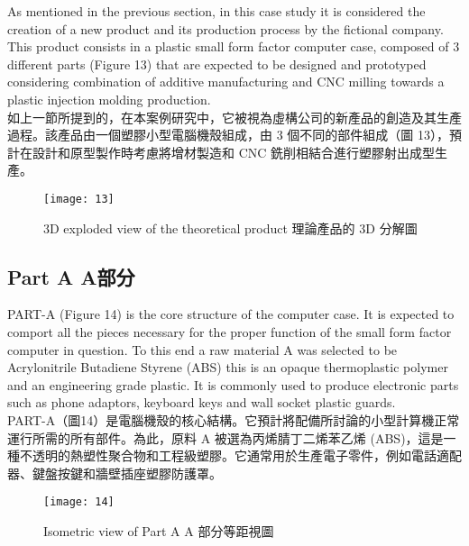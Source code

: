 \fontsize{14pt}{2.5pt}\sectionef 
{As mentioned in the previous section, in this case study it is considered the creation of a new product and its production process by the fictional company. This product consists in a plastic small form factor computer case, composed of 3 different parts (Figure 13) that are expected to be designed and prototyped considering combination of additive manufacturing and CNC milling towards a plastic injection molding production.}\\[10pt]

\fontsize{14pt}{5pt}\sectionef
 {如上一節所提到的，在本案例研究中，它被視為虛構公司的新產品的創造及其生產過程。該產品由一個塑膠小型電腦機殼組成，由 3 個不同的部件組成（圖 13），預計在設計和原型製作時考慮將增材製造和 CNC 銑削相結合進行塑膠射出成型生產。
}\\[25pt]

\begin{figure}[hbt!]
\begin{center}
\texttt{[image: 13]}
\caption{\Large 3D exploded view of the theoretical product 理論產品的 3D 分解圖}\label{fig.13}
\end{center}
\end{figure}
\newpage

\subsection{Part A A部分}

\fontsize{14pt}{2.5pt}\sectionef 
{PART-A (Figure 14) is the core structure of the computer case. It is expected to comport all the pieces necessary for the proper function of the small form factor computer in question. To this end a raw material A was selected to be Acrylonitrile Butadiene Styrene (ABS) this is an opaque thermoplastic polymer and an engineering grade plastic. It is commonly used to produce electronic parts such as phone adaptors, keyboard keys and wall socket plastic guards.}\\[15pt]

\fontsize{14pt}{5pt}\sectionef
 {PART-A（圖14）是電腦機殼的核心結構。它預計將配備所討論的小型計算機正常運行所需的所有部件。為此，原料 A 被選為丙烯腈丁二烯苯乙烯 (ABS)，這是一種不透明的熱塑性聚合物和工程級塑膠。它通常用於生產電子零件，例如電話適配器、鍵盤按鍵和牆壁插座塑膠防護罩。}\\[15pt]

\begin{figure}[hbt!]
\begin{center}
\texttt{[image: 14]}
\caption{\Large Isometric view of Part A A 部分等距視圖}\label{fig.14}
\end{center}
\end{figure}
\vspace{1cm}

